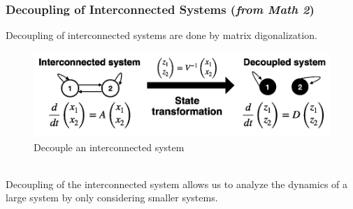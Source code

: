 \documentclass[12pt,a4paper]{article}
\begin{document}
\subsubsection{Decoupling of Interconnected Systems (\textit{from Math 2})}
Decoupling of interconnected systems are done by matrix digonalization. 
\begin{figure}[H] \centering
\includegraphics[width=.8\textwidth]{images/decouple.png}
\caption{Decouple an interconnected system}
\end{figure} \ \\
Decoupling of the interconnected system allows us to analyze the dynamics of a large system by only considering smaller systems.
\end{document}
